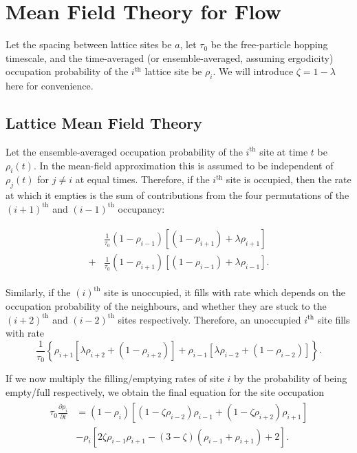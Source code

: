 \documentclass[
reprint, amsmath,amssymb, aps,
 prx,
]{revtex4-1}
\newcommand{\partDeriv}[2]{\frac{\partial #1}{\partial #2}}
\begin{document}
\section{Mean Field Theory for Flow} \label{sec:mftPred}
  
Let the spacing between lattice
sites be $a$, let $\tau_0$ be the free-particle hopping timescale, and
the time-averaged (or ensemble-averaged, assuming ergodicity)
occupation probability of the $i^{\mathrm{th}}$ lattice site be
$\rho_i$.  We will introduce $\zeta = 1 - \lambda $ here for convenience.

\subsection{Lattice Mean Field Theory} Let the ensemble-averaged occupation
probability of the $i^\mathrm{th}$ site at time $t$ be $\rho_i
(t)$. In the mean-field approximation this is assumed to be
independent of $\rho_j(t)$ for $j \neq i $ at equal times. Therefore,
if the $i^\mathrm{th}$ site is occupied, then the rate at which it empties
is the sum of contributions from the
four permutations of the $(i+1)^\mathrm{th}$ and
$(i-1)^\mathrm{th}$ occupancy: 

\begin{align}
\begin{split}
 &\frac{1}{\tau_0 } (1-\rho_{i-1})\left[ (1 - \rho_{i+1}) + \lambda \rho_{i+1} \right] \\
 +&\frac{1}{\tau_0 } (1-\rho_{i+1})\left[ (1 - \rho_{i-1}) + \lambda \rho_{i-1} \right] .
\end{split}
 \end{align}

Similarly, if the $(i)^\mathrm{th}$ site is unoccupied, it fills with
rate which depends on the occupation probability of the neighbours,
and whether they are stuck to the $(i+2)^\mathrm{th}$ and $(i-2)^\mathrm{th}$ sites
respectively. Therefore, an unoccupied $i^\mathrm{th}$ site fills with rate
\begin{equation}
\frac{1}{\tau_0 } \left\{ \rho_{i+1} \left[ \lambda \rho_{i+2} + (1-\rho_{i+2}) \right] + \rho_{i-1} \left[ \lambda \rho_{i-2} + (1-\rho_{i-2}) \right] \right\}.
\end{equation}

If we now multiply the filling/emptying rates of site $i$ by the
probability of being empty/full respectively, we obtain the
final equation for the site occupation 
\begin{align}
\label{eq:latticeMFT}
\begin{split}
 \tau_0 \partDeriv{\rho_i}{t} &= \left( 1-\rho_i \right) \left[ \left(1-\zeta\rho_{i-2} \right) \rho_{i-1} + \left(1-\zeta\rho_{i+2} \right) \rho_{i+1} \right] \\
 &- \rho_i \left[ 2 \zeta \rho_{i-1} \rho_{i+1}  - (3-\zeta)\left(\rho_{i-1} + \rho_{i+1}\right) + 2 \right].
 \end{split}
 \end{align}
\end{document}
